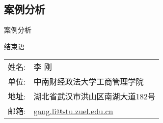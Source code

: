 \documentclass[UTF8]{ctexbeamer}
\begin{document}
\subsection{案例分析}
\begin{frame}{案例分析}
\end{frame}

\begin{frame}{结束语}
\linespread{1.25}
\begin{center}
\vspace{5mm}\large
\begin{tabular}{ll}
{\sc 姓名}:  & \textsf{李 刚}\\
{\sc 单位}: & 中南财经政法大学工商管理学院 \\
{\sc 地址}: & 湖北省武汉市洪山区南湖大道182号 \\
{\sc 邮箱}: & \href{mailto:gang.li@stu.zuel.edu.cn}{\color{blue}gang.li@stu.zuel.edu.cn}\\
\end{tabular}
\end{center}
\end{frame}
\end{document}
